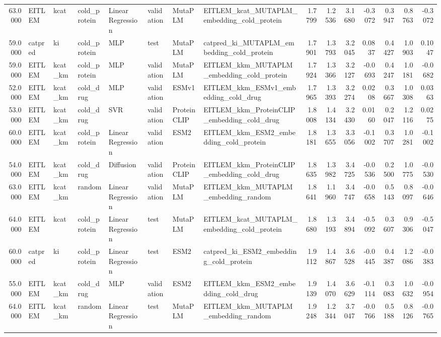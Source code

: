 \begin{tabular}{rlllllllrrrrrrr}
63.0000 & EITLEM & kcat & cold_protein & Linear Regression & validation & MutaPLM & EITLEM_kcat_MUTAPLM_embedding_cold_protein & 1.7799 & 1.2536 & 3.1680 & -0.3072 & 0.3947 & 0.8763 & -0.3072 \\
59.0000 & catpred & ki & cold_protein & MLP & test & MutaPLM & catpred_ki_MUTAPLM_embedding_cold_protein & 1.7901 & 1.3793 & 3.2045 & 0.0837 & 0.4427 & 1.0903 & 0.1047 \\
59.0000 & EITLEM & kcat_km & cold_protein & MLP & validation & MutaPLM & EITLEM_kkm_MUTAPLM_embedding_cold_protein & 1.7924 & 1.3366 & 3.2127 & -0.0693 & 0.4247 & 1.0181 & -0.0682 \\
52.0000 & EITLEM & kcat_km & cold_drug & MLP & validation & ESMv1 & EITLEM_kkm_ESMv1_embedding_cold_drug & 1.7965 & 1.3393 & 3.2274 & 0.0208 & 0.3667 & 1.0308 & 0.0363 \\
53.0000 & EITLEM & kcat_km & cold_drug & SVR & validation & ProteinCLIP & EITLEM_kkm_ProteinCLIP_embedding_cold_drug & 1.8008 & 1.4134 & 3.2430 & 0.0160 & 0.2047 & 1.2116 & 0.0275 \\
60.0000 & EITLEM & kcat_km & cold_protein & Linear Regression & validation & ESM2 & EITLEM_kkm_ESM2_embedding_cold_protein & 1.8181 & 1.3655 & 3.3056 & -0.1002 & 0.3707 & 1.0281 & -0.1002 \\
54.0000 & EITLEM & kcat_km & cold_drug & Diffusion & validation & ProteinCLIP & EITLEM_kkm_ProteinCLIP_embedding_cold_drug & 1.8635 & 1.3982 & 3.4725 & -0.0536 & 0.2500 & 1.0775 & -0.0530 \\
63.0000 & EITLEM & kcat_km & random & Linear Regression & validation & MutaPLM & EITLEM_kkm_MUTAPLM_embedding_random & 1.8641 & 1.1960 & 3.4747 & -0.0658 & 0.5143 & 0.8097 & -0.0646 \\
64.0000 & EITLEM & kcat & cold_protein & Linear Regression & test & MutaPLM & EITLEM_kcat_MUTAPLM_embedding_cold_protein & 1.8680 & 1.3193 & 3.4894 & -0.5092 & 0.3607 & 0.9306 & -0.5047 \\
60.0000 & catpred & ki & cold_protein & Linear Regression & test & ESM2 & catpred_ki_ESM2_embedding_cold_protein & 1.9112 & 1.4867 & 3.6528 & -0.0445 & 0.4387 & 1.2086 & -0.0383 \\
55.0000 & EITLEM & kcat_km & cold_drug & MLP & validation & ESM2 & EITLEM_kkm_ESM2_embedding_cold_drug & 1.9139 & 1.4070 & 3.6629 & -0.1114 & 0.3083 & 1.0632 & -0.0954 \\
64.0000 & EITLEM & kcat_km & random & Linear Regression & test & MutaPLM & EITLEM_kkm_MUTAPLM_embedding_random & 1.9248 & 1.2344 & 3.7047 & -0.0766 & 0.5188 & 0.8126 & -0.0765 \\

\end{tabular}
